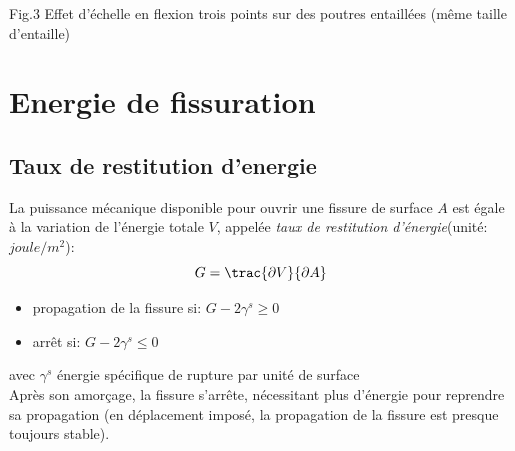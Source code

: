 \documentclass[12pt]{report}
\begin{document}
\begin{center}
\caption{Fig.3 Effet d'échelle en flexion trois points sur des poutres entaillées (même taille d'entaille)}
\end{center}



\chapter{Energie de fissuration}
\section{Taux de restitution d'energie}
\og La puissance mécanique disponible pour ouvrir une fissure de surface $A$ est égale à la variation de l'énergie totale $V$, appelée \emph{taux de restitution d'énergie}\fg{}(unité: $joule/m^2$):
\[G=\trac{\partial V}{\partial A}\]
\begin{itemize}
\item propagation de la fissure si: $G-2\gamma^s \geq 0$
\item arrêt si: {} {} {} {} {} {} {} {} {} {} {} {} {} {} {} {} {} {} {} {} {} {} {} {} {} {} {} {} {} {} {} $G-2\gamma^s \leq 0$
\end{itemize}
avec $\gamma^s$ énergie spécifique de rupture par unité de surface\\
Après son amorçage, la fissure s'arrête, nécessitant plus d'énergie pour reprendre sa propagation (en déplacement imposé, la propagation de la fissure est presque toujours stable).
\end{document}
